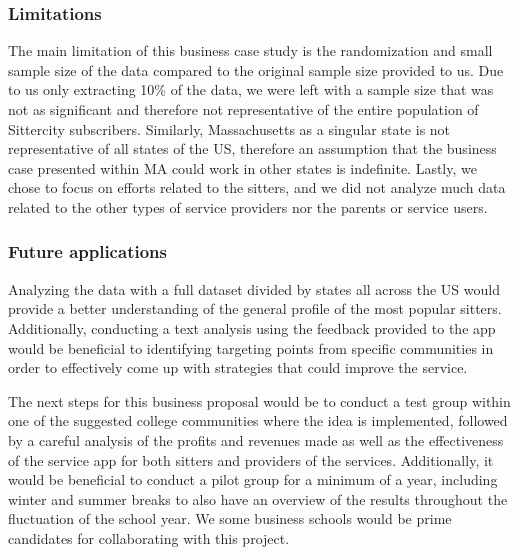 \documentclass[12pt]{article}
\begin{document}
\hypertarget{limitations}{%
\subsubsection{\texorpdfstring{\textbf{Limitations}}{Limitations}}\label{limitations}}

The main limitation of this business case study is the randomization and
small sample size of the data compared to the original sample size
provided to us. Due to us only extracting 10\% of the data, we were left
with a sample size that was not as significant and therefore not
representative of the entire population of Sittercity subscribers.
Similarly, Massachusetts as a singular state is not representative of
all states of the US, therefore an assumption that the business case
presented within MA could work in other states is indefinite. Lastly, we
chose to focus on efforts related to the sitters, and we did not analyze
much data related to the other types of service providers nor the
parents or service users.~

\hypertarget{future-applications}{%
\subsubsection{\texorpdfstring{\textbf{Future
applications}}{Future applications}}\label{future-applications}}

Analyzing the data with a full dataset divided by states all across the
US would provide a better understanding of the general profile of the
most popular sitters. Additionally, conducting a text analysis using the
feedback provided to the app would be beneficial to identifying
targeting points from specific communities in order to effectively come
up with strategies that could improve the service.~

The next steps for this business proposal would be to conduct a test
group within one of the suggested college communities where the idea is
implemented, followed by a careful analysis of the profits and revenues
made as well as the effectiveness of the service app for both sitters
and providers of the services. Additionally, it would be beneficial to
conduct a pilot group for a minimum of a year, including winter and
summer breaks to also have an overview of the results throughout the
fluctuation of the school year. We some business schools would be prime
candidates for collaborating with this project.



\end{document}
